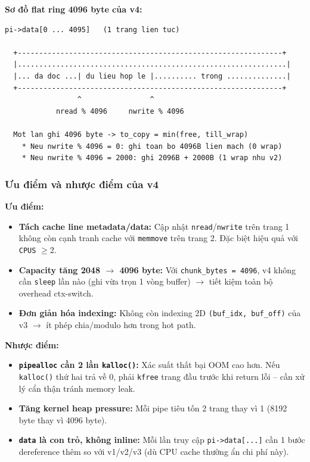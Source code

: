 \documentclass[11pt,a4paper]{article}
\begin{document}
\textbf{Sơ đồ flat ring 4096 byte của v4:}

\begin{lstlisting}[style=plain]
  pi->data[0 ... 4095]   (1 trang lien tuc)

  +--------------------------------------------------------------+
  |...............................................................|
  |... da doc ...| du lieu hop le |.......... trong ..............|
  +--------------------------------------------------------------+
                 ^                ^
            nread % 4096     nwrite % 4096

  Mot lan ghi 4096 byte -> to_copy = min(free, till_wrap)
    * Neu nwrite % 4096 = 0: ghi toan bo 4096B lien mach (0 wrap)
    * Neu nwrite % 4096 = 2000: ghi 2096B + 2000B (1 wrap nhu v2)
\end{lstlisting}

\subsubsection{Ưu điểm và nhược điểm của v4}

\textbf{Ưu điểm:}
\begin{itemize}
  \item \textbf{Tách cache line metadata/data:} Cập nhật \texttt{nread}/\texttt{nwrite} trên trang 1 không còn cạnh tranh cache với \texttt{memmove} trên trang 2. Đặc biệt hiệu quả với \texttt{CPUS} $\geq 2$.
  \item \textbf{Capacity tăng 2048 $\rightarrow$ 4096 byte:} Với \texttt{chunk\_bytes = 4096}, v4 không cần \texttt{sleep} lần nào (ghi vừa trọn 1 vòng buffer) $\rightarrow$ tiết kiệm toàn bộ overhead ctx-switch.
  \item \textbf{Đơn giản hóa indexing:} Không còn indexing 2D \texttt{(buf\_idx, buf\_off)} của v3 $\rightarrow$ ít phép chia/modulo hơn trong hot path.
\end{itemize}

\textbf{Nhược điểm:}
\begin{itemize}
  \item \textbf{\texttt{pipealloc} cần 2 lần \texttt{kalloc()}:} Xác suất thất bại OOM cao hơn. Nếu \texttt{kalloc()} thứ hai trả về 0, phải \texttt{kfree} trang đầu trước khi return lỗi -- cần xử lý cẩn thận tránh memory leak.
  \item \textbf{Tăng kernel heap pressure:} Mỗi pipe tiêu tốn 2 trang thay vì 1 (8192 byte thay vì 4096 byte).
  \item \textbf{\texttt{data} là con trỏ, không inline:} Mỗi lần truy cập \texttt{pi->data[...]} cần 1 bước dereference thêm so với v1/v2/v3 (dù CPU cache thường ẩn chi phí này).
\end{itemize}
\end{document}
